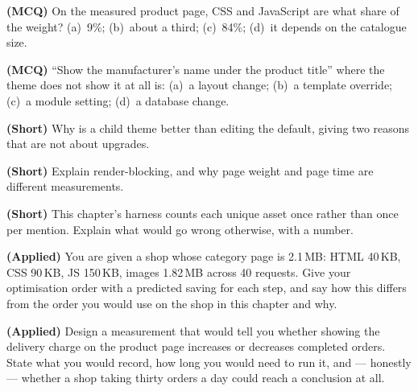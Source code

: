 \begin{reviewq}
  \item \textbf{(MCQ)} On the measured product page, CSS and JavaScript are
        what share of the weight? (a)~9\%; (b)~about a third; (c)~84\%;
        (d)~it depends on the catalogue size.
  \item \textbf{(MCQ)} ``Show the manufacturer's name under the product title''
        where the theme does not show it at all is: (a)~a layout change;
        (b)~a template override; (c)~a module setting; (d)~a database change.
  \item \textbf{(Short)} Why is a child theme better than editing the default,
        giving two reasons that are not about upgrades.
  \item \textbf{(Short)} Explain render-blocking, and why page weight and page
        time are different measurements.
  \item \textbf{(Short)} This chapter's harness counts each unique asset once
        rather than once per mention. Explain what would go wrong otherwise,
        with a number.
  \item \textbf{(Applied)} You are given a shop whose category page is 2.1\,MB:
        HTML 40\,KB, CSS 90\,KB, JS 150\,KB, images 1.82\,MB across 40
        requests. Give your optimisation order with a predicted saving for each
        step, and say how this differs from the order you would use on the shop
        in this chapter and why.
  \item \textbf{(Applied)} Design a measurement that would tell you whether
        showing the delivery charge on the product page increases or decreases
        completed orders. State what you would record, how long you would need
        to run it, and --- honestly --- whether a shop taking thirty orders a
        day could reach a conclusion at all.
\end{reviewq}
